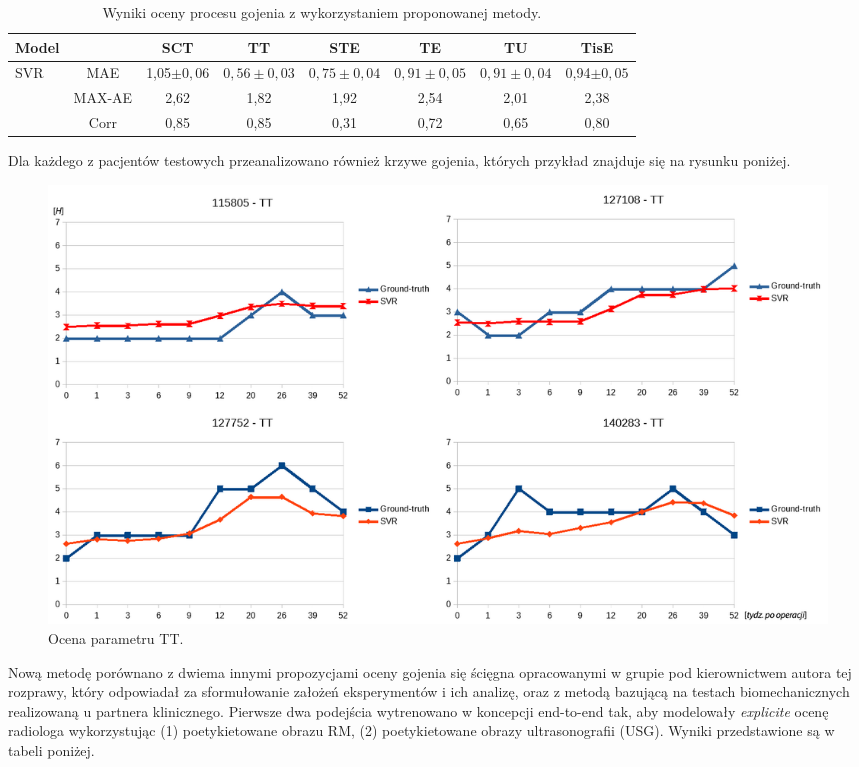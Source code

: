 \begin{table}[]
	\caption{Wyniki oceny procesu gojenia z wykorzystaniem proponowanej metody.}
	\scriptsize
	\begin{center}
		\begin{tabular}{lc||c|c|c|c|c|c}
			\textbf{Model} & & \textbf{SCT} & \textbf{TT} & \textbf{STE} & \textbf{TE} & \textbf{TU} & \textbf{TisE}\\ 
			
			\hline \hline
			\multirow{3}{*}{SVR}
& MAE & 1,05$\pm0,06$ & $0,56\pm0,03$ & $0,75\pm0,04$ & $0,91\pm0,05$ & $0,91\pm0,04$ & 0,94$\pm0,05$\\
& MAX-AE & 2,62 & 1,82 & 1,92 & 2,54 & 2,01 & 2,38 \\
& Corr   & 0,85 & 0,85 & 0,31 & 0,72 & 0,65 & 0,80 \\
\hline
		\end{tabular}
	\end{center}
	\label{tab:trainset}
\end{table}

Dla każdego z pacjentów testowych przeanalizowano również krzywe gojenia, których przykład znajduje się na rysunku poniżej.

\begin{figure}[h!]
	\centering
	\includegraphics[width=1\textwidth]{figures/TT.png}
	\caption{Ocena parametru TT.}\label{fig:TT}
\end{figure}

Nową metodę porównano z dwiema innymi propozycjami oceny gojenia się ścięgna opracowanymi w grupie pod kierownictwem autora tej rozprawy, który odpowiadał za sformułowanie założeń eksperymentów i ich analizę, oraz z metodą bazującą na testach biomechanicznych realizowaną u partnera klinicznego. Pierwsze dwa podejścia wytrenowano w koncepcji end-to-end tak, aby modelowały \textit{explicite} ocenę radiologa wykorzystując (1) poetykietowane obrazu RM, (2) poetykietowane obrazy ultrasonografii (USG). Wyniki przedstawione są w tabeli poniżej.

